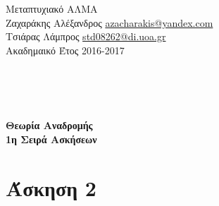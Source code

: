 \documentclass[11pt]{article}
\begin{document}
\noindent\begin{minipage}{\textwidth}

  \begin{minipage}[b]{.6\textwidth}
    \large{
      Μεταπτυχιακό ΑΛΜΑ\\
      Ζαχαράκης Αλέξανδρος \href{mailto:azacharakis@yandex.com}{azacharakis@yandex.com}\\
      Τσιάρας Λάμπρος \href{mailto:std08262@di.uoa.gr}{std08262@di.uoa.gr} \\
      Ακαδημαικό Έτος 2016-2017
    }
    \\
  \end{minipage}

\end{minipage}
\\ \\ \\
\begin{center}
  \textbf{\Large{Θεωρία Αναδρομής}}\\
  \textbf{\Large{1η Σειρά Ασκήσεων}}
\end{center}                


\section*{Άσκηση 2}



\end{document}
